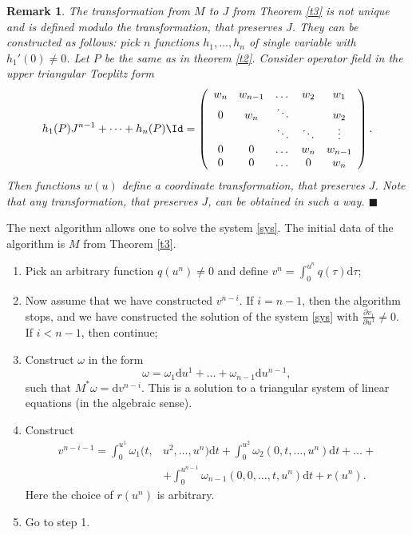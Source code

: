 \documentclass[12pt]{article}
\newtheorem{Remark}{Remark}[section]
\theoremstyle{remark}
\newcommand{\ddd}{\mathrm{d}}
\newcommand{\pd}[2]{\frac{\partial#1}{\partial#2}}
\begin{document}
\begin{Remark}\label{r1}
\rm{
The transformation from $M$ to $J$ from Theorem \ref{t3} is not unique and is defined modulo the transformation, that preserves $J$. They can be constructed as follows: pick $n$ functions $h_1, \dots, h_n$ of single variable with $h_1'(0) \neq 0$. Let $P$ be the same as in theorem \ref{t2}. Consider operator field in the upper triangular Toeplitz form
$$
h_1(P)J^{n - 1} + \dots + h_n(P) \Id = \left( \begin{array}{ccccc}
     w_n & w_{n - 1} &\dots  & w_2 & w_1  \\
     0 & w_n & \ddots & & w_2 \\
     &  &\ddots & \ddots & \vdots\\
     0 & 0 & \dots & w_n & w_{n - 1} \\
     0 & 0 & \dots & 0 & w_n
\end{array}\right). 
$$
Then functions $w(u)$ define a coordinate transformation, that preserves $J$. Note that any transformation, that preserves $J$, can be obtained in such a way. $\blacksquare$
}    
\end{Remark}

The next algorithm allows one to solve the system \eqref{sys}. The initial data of the algorithm is $M$ from Theorem \ref{t3}.
\begin{enumerate}
    \item[Step 0:] Pick an arbitrary function $q(u^n) \neq 0$ and define $v^n = \int_0^{u^n} q(\tau) \ddd \tau$;
    \item[Step 1:] Now assume that we have constructed $v^{n - i}$. If $i = n - 1$, then the algorithm stops, and we have constructed the solution of the system \eqref{sys} with $\pd{v_1}{u^1} \neq 0$. If $i < n - 1$, then continue;
    \item[Step 2:] Construct $\omega$ in the form
    $$
    \omega = \omega_1 \ddd u^1 + \dots + \omega_{n - 1} \ddd u^{n - 1},
    $$
    such that $M^* \omega = \ddd v^{n - i}$. This is a solution to a triangular system of linear equations (in the algebraic sense).
\item[Step 3:] Construct
     \begin{equation}\label{form2}
     \begin{aligned}
     v^{n - i - 1} = \int_0^{u^1} \omega_1(t, &  u^2, \dots, u^n) \ddd t + \int_0^{u^2} \omega_2(0, t, \dots, u^n) \ddd t  + \dots + \\
     & + \int_0^{u^{n - 1}} \omega_{n - 1}(0, 0, \dots, t,  u^n) \ddd t  + r(u^n).    
     \end{aligned} 
    \end{equation}
    Here the choice of $r(u^n)$ is arbitrary.
    \item[Step 4:] Go to step 1.
\end{enumerate}
\end{document}
